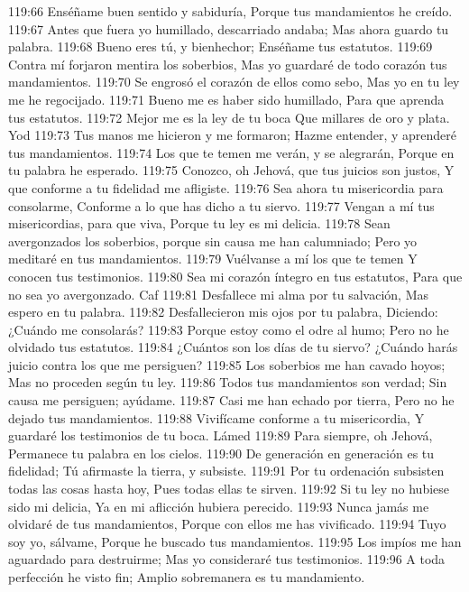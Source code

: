 119:66 Enséñame buen sentido y sabiduría, 
Porque tus mandamientos he creído. 
119:67 Antes que fuera yo humillado, descarriado andaba; 
Mas ahora guardo tu palabra. 
119:68 Bueno eres tú, y bienhechor; 
Enséñame tus estatutos. 
119:69 Contra mí forjaron mentira los soberbios, 
Mas yo guardaré de todo corazón tus mandamientos. 
119:70 Se engrosó el corazón de ellos como sebo, 
Mas yo en tu ley me he regocijado. 
119:71 Bueno me es haber sido humillado, 
Para que aprenda tus estatutos. 
119:72 Mejor me es la ley de tu boca 
Que millares de oro y plata. 
Yod 
119:73 Tus manos me hicieron y me formaron; 
Hazme entender, y aprenderé tus mandamientos. 
119:74 Los que te temen me verán, y se alegrarán, 
Porque en tu palabra he esperado. 
119:75 Conozco, oh Jehová, que tus juicios son justos, 
Y que conforme a tu fidelidad me afligiste. 
119:76 Sea ahora tu misericordia para consolarme, 
Conforme a lo que has dicho a tu siervo. 
119:77 Vengan a mí tus misericordias, para que viva, 
Porque tu ley es mi delicia. 
119:78 Sean avergonzados los soberbios, porque sin causa me han calumniado; 
Pero yo meditaré en tus mandamientos. 
119:79 Vuélvanse a mí los que te temen 
Y conocen tus testimonios. 
119:80 Sea mi corazón íntegro en tus estatutos, 
Para que no sea yo avergonzado. 
Caf 
119:81 Desfallece mi alma por tu salvación, 
Mas espero en tu palabra. 
119:82 Desfallecieron mis ojos por tu palabra, 
Diciendo: ¿Cuándo me consolarás? 
119:83 Porque estoy como el odre al humo; 
Pero no he olvidado tus estatutos. 
119:84 ¿Cuántos son los días de tu siervo? 
¿Cuándo harás juicio contra los que me persiguen? 
119:85 Los soberbios me han cavado hoyos; 
Mas no proceden según tu ley. 
119:86 Todos tus mandamientos son verdad; 
Sin causa me persiguen; ayúdame. 
119:87 Casi me han echado por tierra, 
Pero no he dejado tus mandamientos. 
119:88 Vivifícame conforme a tu misericordia, 
Y guardaré los testimonios de tu boca. 
Lámed 
119:89 Para siempre, oh Jehová, 
Permanece tu palabra en los cielos. 
119:90 De generación en generación es tu fidelidad; 
Tú afirmaste la tierra, y subsiste. 
119:91 Por tu ordenación subsisten todas las cosas hasta hoy, 
Pues todas ellas te sirven. 
119:92 Si tu ley no hubiese sido mi delicia, 
Ya en mi aflicción hubiera perecido. 
119:93 Nunca jamás me olvidaré de tus mandamientos, 
Porque con ellos me has vivificado. 
119:94 Tuyo soy yo, sálvame, 
Porque he buscado tus mandamientos. 
119:95 Los impíos me han aguardado para destruirme; 
Mas yo consideraré tus testimonios. 
119:96 A toda perfección he visto fin; 
Amplio sobremanera es tu mandamiento. 
